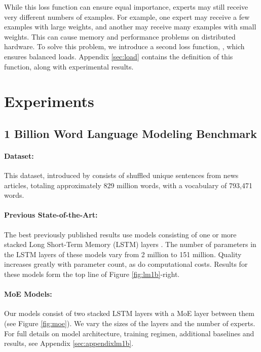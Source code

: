 \documentclass{article} \pdfoutput=1
\begin{document}
While this loss function can ensure equal importance, experts may still receive very different numbers of examples.  For example, one expert may receive a few examples with large weights, and another may receive many examples with small weights.  This can cause memory and performance problems on distributed hardware.  To solve this problem, we introduce a second loss function,  , which ensures balanced loads.  Appendix \ref{sec:load} contains the definition of this function, along with experimental results.

\section{Experiments}


\subsection{1 Billion Word Language Modeling Benchmark}\label{sec:lm}

\paragraph{Dataset:} This dataset, introduced by \citep{chelba2013one} consists of shuffled unique sentences from news articles, totaling approximately 829 million words, with a vocabulary of 793,471 words.

\paragraph{Previous State-of-the-Art:} The best previously published results \citep{RafalNoam16} use models consisting of one or more stacked Long Short-Term Memory (LSTM) layers \citep{Hochreiter:1997:LSM,Gers:2000:LFC}.  The number of parameters in the LSTM layers of these models vary from 2 million to 151 million.  Quality increases greatly with parameter count, as do computational costs.  Results for these models form the top line of Figure \ref{fig:lm1b}-right.

\paragraph{MoE Models:} Our models consist of two stacked LSTM layers with a MoE layer between them (see Figure \ref{fig:moe}).  We vary the sizes of the layers and the number of experts.   For full details on model architecture, training regimen, additional baselines and results, see Appendix \ref{sec:appendixlm1b}.   
\end{document}
